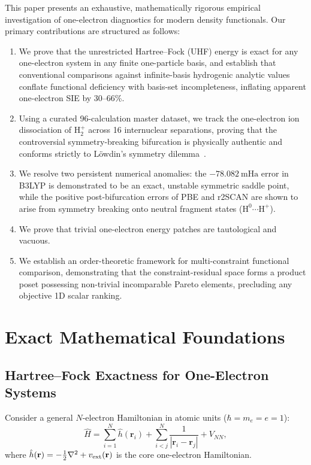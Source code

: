 \documentclass[journal]{IEEEtran}
\begin{document}
This paper presents an exhaustive, mathematically rigorous empirical investigation of one-electron diagnostics for modern density functionals. Our primary contributions are structured as follows:
\begin{enumerate}
\item We prove that the unrestricted Hartree--Fock (UHF) energy is exact for any one-electron system in any finite one-particle basis, and establish that conventional comparisons against infinite-basis hydrogenic analytic values conflate functional deficiency with basis-set incompleteness, inflating apparent one-electron SIE by 30--66\%.
\item Using a curated 96-calculation master dataset, we track the one-electron ion dissociation of $\text{H}_2^+$ across 16 internuclear separations, proving that the controversial symmetry-breaking bifurcation is physically authentic and conforms strictly to Löwdin's symmetry dilemma~\cite{Lowdin1963}.
\item We resolve two persistent numerical anomalies: the $-78.082\ \text{mHa}$ error in B3LYP is demonstrated to be an exact, unstable symmetric saddle point, while the positive post-bifurcation errors of PBE and r2SCAN are shown to arise from symmetry breaking onto neutral fragment states ($\text{H}^0 \cdots \text{H}^+$).
\item We prove that trivial one-electron energy patches are tautological and vacuous.
\item We establish an order-theoretic framework for multi-constraint functional comparison, demonstrating that the constraint-residual space forms a product poset possessing non-trivial incomparable Pareto elements, precluding any objective 1D scalar ranking.
\end{enumerate}

\section{Exact Mathematical Foundations}
\label{sec:theory}

\subsection{Hartree--Fock Exactness for One-Electron Systems}
Consider a general $N$-electron Hamiltonian in atomic units ($\hbar = m_e = e = 1$):
\begin{equation}
\hat H = \sum_{i=1}^N \hat h(\mathbf r_i) + \sum_{i < j}^N \frac{1}{|\mathbf r_i - \mathbf r_j|} + V_{NN},
\label{eq:hamiltonian}
\end{equation}
where $\hat h(\mathbf r) = -\tfrac12 \nabla^2 + v_{\rm ext}(\mathbf r)$ is the core one-electron Hamiltonian.
\end{document}
